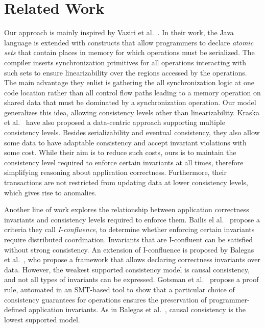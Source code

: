 \documentclass[numbers]{sigplanconf}
\begin{document}
\section{Related Work}
\label{sec:relatedwork}
Our approach is mainly inspired by Vaziri et al.~\cite{dolby2012data}. In their work, 
the Java language is extended with constructs that allow programmers to declare
\emph{atomic sets} that contain places in memory for which operations must be
serialized. The compiler inserts synchronization primitives for all
operations interacting with such sets to ensure linearizability over the
regions accessed by the operations. The main advantage they enlist is gathering
the all synchronization logic at one code location rather than all  control flow
paths leading to a memory operation on
shared data that must be dominated by a synchronization operation. 
Our model generalizes this idea, allowing consistency
levels other than linearizability.
Kraska et al.~\cite{kraska2009consistency} have also proposed a data-centric
approach supporting multiple consistency levels. Besides 
serializability and eventual consistency, they also allow some data to have adaptable consistency and
accept invariant violations with some cost. While their aim is to reduce
such costs, ours is to maintain the consistency level required to enforce
certain invariants at all times, therefore simplifying reasoning about 
application
correctness. Furthermore, their transactions are not restricted from updating
data at lower consistency levels, which gives rise to anomalies.

Another line of work explores the relationship between
application correctness invariants and consistency levels required to enforce them.
Bailis el al.~\cite{bailis2014coordination} propose a criteria they call
\emph{I-confluence}, to determine whether enforcing certain invariants require distributed
coordination. Invariants that are I-confluent can be satisfied without strong
consistency. 
An extension of I-confluence is proposed by Balegas et
al.~\cite{balegas2015putting}, who propose a framework that allows declaring
correctness invariants over data. However, the weakest supported consistency
model is causal consistency, and not all types of invariants can be
expressed.
Gotsman et al.~\cite{gotsman2016cause} propose a proof rule, automated in an SMT-based
tool to show that a particular choice of consistency guarantees for operations
ensures the preservation of programmer-defined application invariants. As in
Balegas et al.~\cite{balegas2015putting}, causal consistency is the lowest supported model.
\end{document}
